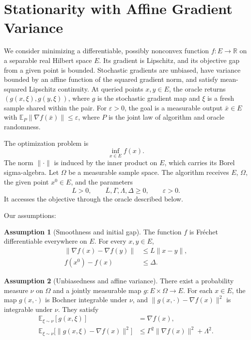 \documentclass[10pt]{article}
\theoremstyle{definition}
\newtheorem{assumption}{Assumption}
\begin{document}
\section*{Stationarity with Affine Gradient Variance}
We consider minimizing a differentiable, possibly nonconvex function $f:E\to\mathbb{R}$ on a separable real Hilbert space $E$. Its gradient is Lipschitz, and its objective gap from a given point is bounded. Stochastic gradients are unbiased, have variance bounded by an affine function of the squared gradient norm, and satisfy mean-squared Lipschitz continuity. At queried points $x,y\in E$, the oracle returns $(g(x,\xi),g(y,\xi))$, where $g$ is the stochastic gradient map and $\xi$ is a fresh sample shared within the pair. For $\varepsilon>0$, the goal is a measurable output $\bar{x}\in E$ with $\mathbb{E}_{P}\|\nabla f(\bar{x})\|\leq\varepsilon$, where $P$ is the joint law of algorithm and oracle randomness.

The optimization problem is
\[
\inf_{x\in E} f(x).
\]
The norm $\|\cdot\|$ is induced by the inner product on $E$, which carries its Borel sigma-algebra. Let $\Omega$ be a measurable sample space. The algorithm receives $E$, $\Omega$, the given point $x^0\in E$, and the parameters
\[
L>0,\qquad \overline{L},\Gamma,\Lambda,\Delta\geq 0,
\qquad \varepsilon>0.
\]
It accesses the objective through the oracle described below.

Our assumptions:
\begin{assumption}[Smoothness and initial gap]
The function $f$ is Fr\'echet differentiable everywhere on $E$. For every $x,y\in E$,
\[
\begin{aligned}
\|\nabla f(x)-\nabla f(y)\|&\leq L\|x-y\|,\\
f(x^0)-f(x)&\leq\Delta.
\end{aligned}
\]
\end{assumption}

\begin{assumption}[Unbiasedness and affine variance]
There exist a probability measure $\nu$ on $\Omega$ and a jointly measurable map $g:E\times\Omega\to E$. For each $x\in E$, the map $g(x,\cdot)$ is Bochner integrable under $\nu$, and $\|g(x,\cdot)-\nabla f(x)\|^2$ is integrable under $\nu$. They satisfy
\[
\begin{aligned}
\mathbb{E}_{\xi\sim\nu}[g(x,\xi)]&=\nabla f(x),\\
\mathbb{E}_{\xi\sim\nu}\bigl[\|g(x,\xi)-\nabla f(x)\|^2\bigr]
&\leq\Gamma^2\|\nabla f(x)\|^2+\Lambda^2.
\end{aligned}
\]
\end{assumption}
\end{document}
